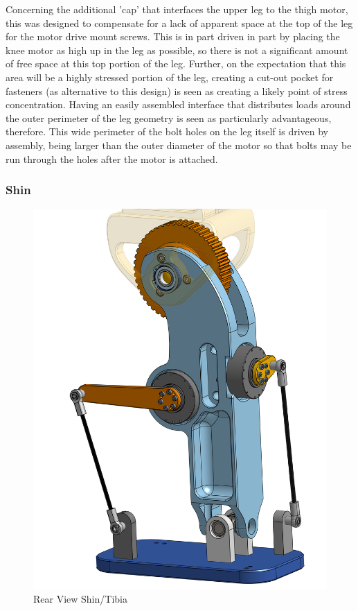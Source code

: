 \documentclass{article}
\begin{document}
Concerning the additional 'cap' that interfaces the upper leg to the thigh motor, this was designed to compensate for a lack of apparent space at the top of the leg for the motor drive mount screws. This is in part driven in part by placing the knee motor as high up in the leg as possible, so there is not a significant amount of free space at this top portion of the leg. Further, on the expectation that this area will be a highly stressed portion of the leg, creating a cut-out pocket for fasteners (as alternative to this design) is seen as creating a likely point of stress concentration. Having an easily assembled interface that distributes loads around the outer perimeter of the leg geometry is seen as particularly advantageous, therefore. This wide perimeter of the bolt holes on the leg itself is driven by assembly, being larger than the outer diameter of the motor so that bolts may be run through the holes after the motor is attached.

\subsubsection{Shin}

\begin{figure}
    \centering
    \includegraphics[width=0.5\linewidth]{assets/MOHRA/Sub-Leg/LegAssem_ShinL.png}
    \caption{Rear View Shin/Tibia}
    \label{fig:enter-label}
\end{figure}
\end{document}
